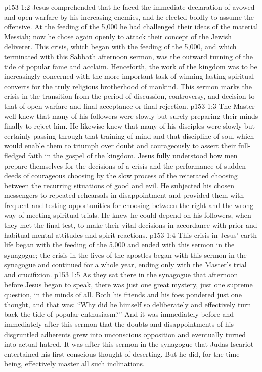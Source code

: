 \vs p153 1:2 Jesus comprehended that he faced the immediate declaration of avowed and open warfare by his increasing enemies, and he elected boldly to assume the offensive. At the feeding of the 5,000 he had challenged their ideas of the material Messiah; now he chose again openly to attack their concept of the Jewish deliverer. This crisis, which began with the feeding of the 5,000, and which terminated with this Sabbath afternoon sermon, was the outward turning of the tide of popular fame and acclaim. Henceforth, the work of the kingdom was to be increasingly concerned with the more important task of winning lasting spiritual converts for the truly religious brotherhood of mankind. This sermon marks the crisis in the transition from the period of discussion, controversy, and decision to that of open warfare and final acceptance or final rejection.
\vs p153 1:3 The Master well knew that many of his followers were slowly but surely preparing their minds finally to reject him. He likewise knew that many of his disciples were slowly but certainly passing through that training of mind and that discipline of soul which would enable them to triumph over doubt and courageously to assert their full\hyp{}fledged faith in the gospel of the kingdom. Jesus fully understood how men prepare themselves for the decisions of a crisis and the performance of sudden deeds of courageous choosing by the slow process of the reiterated choosing between the recurring situations of good and evil. He subjected his chosen messengers to repeated rehearsals in disappointment and provided them with frequent and testing opportunities for choosing between the right and the wrong way of meeting spiritual trials. He knew he could depend on his followers, when they met the final test, to make their vital decisions in accordance with prior and habitual mental attitudes and spirit reactions.
\vs p153 1:4 \pc This crisis in Jesus’ earth life began with the feeding of the 5,000 and ended with this sermon in the synagogue; the crisis in the lives of the apostles began with this sermon in the synagogue and continued for a whole year, ending only with the Master’s trial and crucifixion.
\vs p153 1:5 \pc As they sat there in the synagogue that afternoon before Jesus began to speak, there was just one great mystery, just one supreme question, in the minds of all. Both his friends and his foes pondered just one thought, and that was: “Why did he himself so deliberately and effectively turn back the tide of popular enthusiasm?” And it was immediately before and immediately after this sermon that the doubts and disappointments of his disgruntled adherents grew into unconscious opposition and eventually turned into actual hatred. It was after this sermon in the synagogue that Judas Iscariot entertained his first conscious thought of deserting. But he did, for the time being, effectively master all such inclinations.
